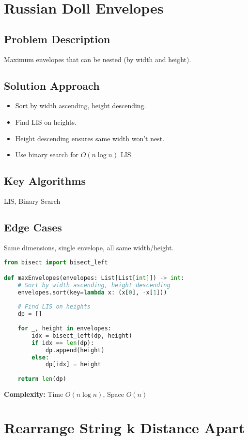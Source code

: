 \documentclass[10pt, a4paper]{article}
\begin{document}
\section{Russian Doll Envelopes}
\subsection*{Problem Description}
Maximum envelopes that can be nested (by width and height).

\subsection*{Solution Approach}
\begin{itemize}
    \item Sort by width ascending, height descending.
    \item Find LIS on heights.
    \item Height descending ensures same width won't nest.
    \item Use binary search for $O(n \log n)$ LIS.
\end{itemize}

\subsection*{Key Algorithms}
LIS, Binary Search

\subsection*{Edge Cases}
Same dimensions, single envelope, all same width/height.

\begin{lstlisting}[language=Python]
from bisect import bisect_left

def maxEnvelopes(envelopes: List[List[int]]) -> int:
    # Sort by width ascending, height descending
    envelopes.sort(key=lambda x: (x[0], -x[1]))
    
    # Find LIS on heights
    dp = []
    
    for _, height in envelopes:
        idx = bisect_left(dp, height)
        if idx == len(dp):
            dp.append(height)
        else:
            dp[idx] = height
    
    return len(dp)
\end{lstlisting}
\textbf{Complexity:} Time $O(n \log n)$, Space $O(n)$

\section{Rearrange String k Distance Apart}
\end{document}
